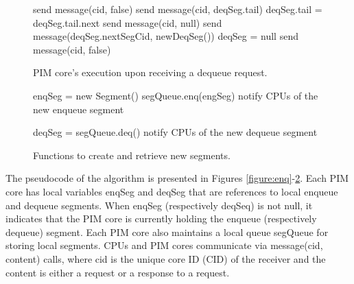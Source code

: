 \begin{figure}
\begin{algorithm}[H]
\Begin
{
    {
        send message(cid, false)\;
    }
    {
        {
			send message(cid, deqSeg.tail)\;
            deqSeg.tail = deqSeg.tail.next\;   
        }
        {
			{
				send message(cid, null)\;
			}
            {
                send message(deqSeg.nextSegCid, newDeqSeg())\;
                deqSeg = null\;
                send message(cid, false)\;
            }            
        }
    }
}
\end{algorithm}
\caption{PIM core's execution upon receiving a dequeue request.}
\label{figure:deq}
\end{figure}

\begin{figure}
\begin{algorithm}[H]
\Begin
{
    enqSeg = new Segment() \;
    segQueue.enq(engSeg) \;
    notify CPUs of the new enqueue segment\;
}
\end{algorithm}

\begin{algorithm}[H]
\Begin
{
    deqSeg = segQueue.deq() \;
    notify CPUs of the new dequeue segment\;
}
\end{algorithm}	
\caption{Functions to create and retrieve new segments.}
\label{figure:newSegment}
\end{figure}

The pseudocode of the algorithm is presented in 
Figures \ref{figure:enq}-\ref{figure:newSegment}. 
Each PIM core has local variables enqSeg and deqSeg that are references to 
local enqueue and dequeue segments.
When enqSeg (respectively deqSeq) is not null, it indicates that the PIM core is currently 
holding the enqueue (respectively dequeue) segment.
Each PIM core also maintains a local queue segQueue for storing local segments.
CPUs and PIM cores communicate via message(cid, content) calls, where cid is the unique core ID (CID) 
of the receiver and the content is either a request or a response to a request.

